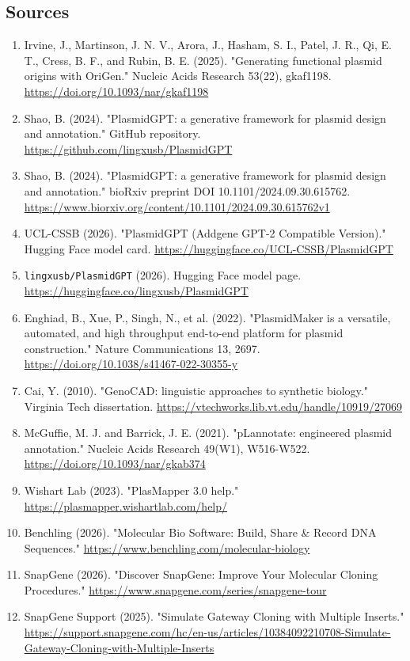 \documentclass[11pt]{report}
\begin{document}
\subsection{Sources}
\begin{enumerate}
\item Irvine, J., Martinson, J. N. V., Arora, J., Hasham, S. I., Patel, J. R., Qi, E. T., Cress, B. F., and Rubin, B. E. (2025). "Generating functional plasmid origins with OriGen." Nucleic Acids Research 53(22), gkaf1198. \url{https://doi.org/10.1093/nar/gkaf1198}
\item Shao, B. (2024). "PlasmidGPT: a generative framework for plasmid design and annotation." GitHub repository. \url{https://github.com/lingxusb/PlasmidGPT}
\item Shao, B. (2024). "PlasmidGPT: a generative framework for plasmid design and annotation." bioRxiv preprint DOI 10.1101/2024.09.30.615762. \url{https://www.biorxiv.org/content/10.1101/2024.09.30.615762v1}
\item UCL-CSSB (2026). "PlasmidGPT (Addgene GPT-2 Compatible Version)." Hugging Face model card. \url{https://huggingface.co/UCL-CSSB/PlasmidGPT}
\item \texttt{lingxusb/PlasmidGPT} (2026). Hugging Face model page. \url{https://huggingface.co/lingxusb/PlasmidGPT}
\item Enghiad, B., Xue, P., Singh, N., et al. (2022). "PlasmidMaker is a versatile, automated, and high throughput end-to-end platform for plasmid construction." Nature Communications 13, 2697. \url{https://doi.org/10.1038/s41467-022-30355-y}
\item Cai, Y. (2010). "GenoCAD: linguistic approaches to synthetic biology." Virginia Tech dissertation. \url{https://vtechworks.lib.vt.edu/handle/10919/27069}
\item McGuffie, M. J. and Barrick, J. E. (2021). "pLannotate: engineered plasmid annotation." Nucleic Acids Research 49(W1), W516-W522. \url{https://doi.org/10.1093/nar/gkab374}
\item Wishart Lab (2023). "PlasMapper 3.0 help." \url{https://plasmapper.wishartlab.com/help/}
\item Benchling (2026). "Molecular Bio Software: Build, Share \& Record DNA Sequences." \url{https://www.benchling.com/molecular-biology}
\item SnapGene (2026). "Discover SnapGene: Improve Your Molecular Cloning Procedures." \url{https://www.snapgene.com/series/snapgene-tour}
\item SnapGene Support (2025). "Simulate Gateway Cloning with Multiple Inserts." \url{https://support.snapgene.com/hc/en-us/articles/10384092210708-Simulate-Gateway-Cloning-with-Multiple-Inserts}

\end{enumerate}
\end{document}
